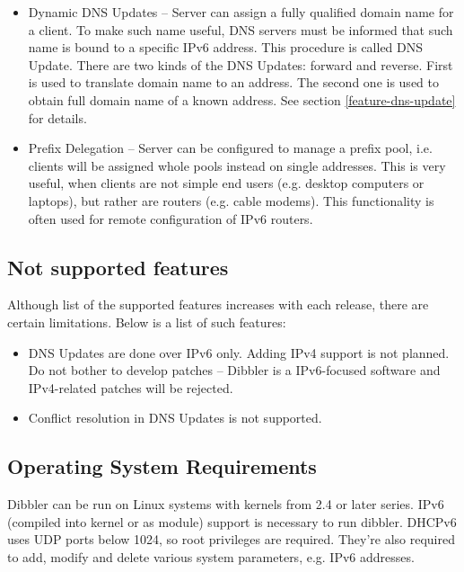 \begin{itemize}
      be handy if one of those parameters change. \cite{rfc4242}
\item Dynamic DNS Updates -- Server can assign a fully qualified
      domain name for a client. To make such name useful, DNS servers
      must be informed that such name is bound to a specific IPv6
      address. This procedure is called DNS Update. There are two kinds
      of the DNS Updates: forward and reverse. First is used to
      translate domain name to an address. The second one is used to
      obtain full domain name of a known address. See section
      \ref{feature-dns-update} for details. \cite{rfc4704}
\item Prefix Delegation -- Server can be configured to manage a prefix
      pool, i.e. clients will be assigned whole pools instead on
      single addresses. This is very useful, when clients are not
      simple end users (e.g. desktop computers or laptops), but rather
      are routers (e.g. cable modems). This functionality is often
      used for remote configuration of IPv6 routers. \cite{rfc3633}
\end{itemize}

\subsection{Not supported features}
Although list of the supported features increases with each release,
there are certain limitations. Below is a list of such
features:

\begin{itemize}
 \item DNS Updates are done over IPv6 only. Adding IPv4 support is
   not planned. Do not bother to develop patches -- Dibbler is a
   IPv6-focused software and IPv4-related patches will be rejected.
\item Conflict resolution in DNS Updates is not supported.
\end{itemize}

\subsection{Operating System Requirements}
\label{requirements}
Dibbler can be run on Linux systems with kernels from 2.4 or later
series. IPv6 (compiled into kernel or as module) support is necessary
to run dibbler. DHCPv6 uses UDP ports below 1024, so root privileges
are required. They're also required to add, modify and delete various
system parameters, e.g. IPv6 addresses.

